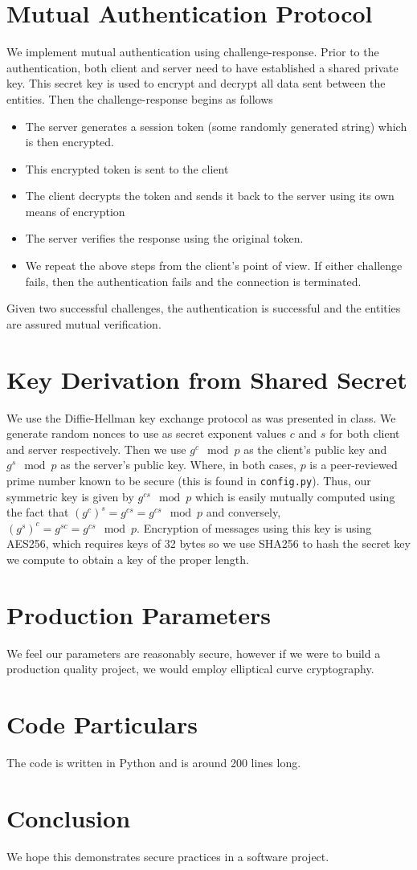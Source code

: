 \documentclass[conference]{IEEEtran}
\begin{document}
\section{Mutual Authentication Protocol}
We implement mutual authentication using challenge-response. Prior to the authentication, both client and server need to have established a shared private key. This secret key is used to encrypt and decrypt all data sent between the entities. Then the challenge-response begins as follows
\begin{itemize}
	\item The server generates a session token (some randomly generated string) which is then encrypted. 
	\item This encrypted token is sent to the client
	\item The client decrypts the token and sends it back to the server using its own means of encryption
	\item The server verifies the response using the original token.
	\item We repeat the above steps from the client's point of view. If either challenge fails, then the authentication fails and the connection is terminated. 
\end{itemize}
Given two successful challenges, the authentication is successful and the entities are assured mutual verification. 
\section{Key Derivation from Shared Secret}
We use the Diffie-Hellman key exchange protocol as was presented in class. We generate random nonces to use as secret exponent values $c$ and $s$ for both client and server respectively. Then we use $g^c\mod p$ as the client's public key and $g^s\mod p$ as the server's public key. Where, in both cases, $p$ is a peer-reviewed prime number known to be secure (this is found in {\tt config.py}). 
Thus, our symmetric key is given by $g^{cs}\mod p$ which is easily mutually computed using the fact that $(g^c)^s = g^{cs} = g^{cs}\mod p$ and conversely, $(g^s)^c = g^{sc} = g^{cs}\mod p$. Encryption of messages using this key is using AES256, which requires keys of 32 bytes so we use SHA256 to hash the secret key we compute to obtain a key of the proper length.
\section{Production Parameters}
We feel our parameters are reasonably secure, however if we were to build a production quality project, we would employ elliptical curve cryptography. 
\section{Code Particulars}
The code is written in Python and is around 200 lines long.



\section{Conclusion}
We hope this demonstrates secure practices in a software project. 


\end{document}

